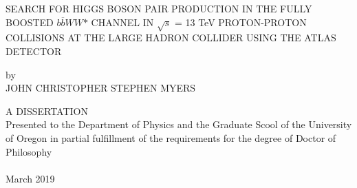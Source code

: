 \thispagestyle{empty}
\begin{center}
SEARCH FOR HIGGS BOSON PAIR PRODUCTION IN THE FULLY BOOSTED ${b\overline{b}WW\text{*}}$ CHANNEL IN ${\sqrt{s}}$ =  13 TeV PROTON-PROTON COLLISIONS AT THE LARGE HADRON COLLIDER USING THE ATLAS DETECTOR

\vspace*{\fill}
by\\
JOHN CHRISTOPHER STEPHEN MYERS
\vspace*{\fill}

A DISSERTATION \\
Presented to the Department of Physics and the Graduate Scool of the University of Oregon in partial fulfillment of the requirements for the degree of Doctor of Philosophy\\~\\
March 2019
\end{center}
